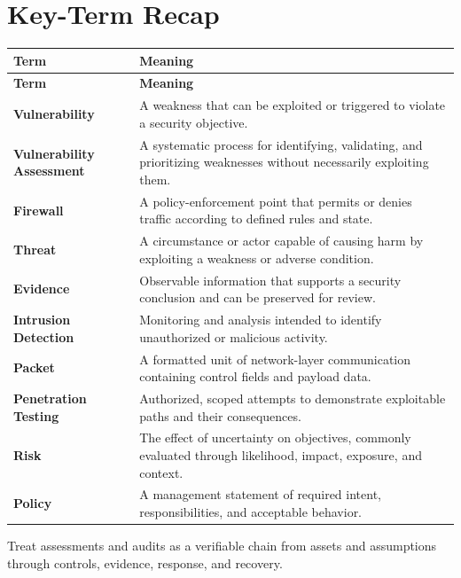 \documentclass[11pt]{article}
\begin{document}
\section*{Key-Term Recap}
\begin{longtable}{>{\RaggedRight\arraybackslash}p{}>{\RaggedRight\arraybackslash}p{}}
\toprule\rowcolor{Navy}\color{white}\textbf{Term} & \color{white}\textbf{Meaning}\\\midrule
\endfirsthead
\toprule\rowcolor{Navy}\color{white}\textbf{Term} & \color{white}\textbf{Meaning}\\\midrule
\endhead
\textbf{Vulnerability} & A weakness that can be exploited or triggered to violate a security objective. \\\midrule
\textbf{Vulnerability Assessment} & A systematic process for identifying, validating, and prioritizing weaknesses without necessarily exploiting them. \\\midrule
\textbf{Firewall} & A policy-enforcement point that permits or denies traffic according to defined rules and state. \\\midrule
\textbf{Threat} & A circumstance or actor capable of causing harm by exploiting a weakness or adverse condition. \\\midrule
\textbf{Evidence} & Observable information that supports a security conclusion and can be preserved for review. \\\midrule
\textbf{Intrusion Detection} & Monitoring and analysis intended to identify unauthorized or malicious activity. \\\midrule
\textbf{Packet} & A formatted unit of network-layer communication containing control fields and payload data. \\\midrule
\textbf{Penetration Testing} & Authorized, scoped attempts to demonstrate exploitable paths and their consequences. \\\midrule
\textbf{Risk} & The effect of uncertainty on objectives, commonly evaluated through likelihood, impact, exposure, and context. \\\midrule
\textbf{Policy} & A management statement of required intent, responsibilities, and acceptable behavior. \\\midrule
\bottomrule
\end{longtable}
\begin{takeawaybox}
Treat assessments and audits as a verifiable chain from assets and assumptions through controls, evidence, response, and recovery.
\end{takeawaybox}
\end{document}

